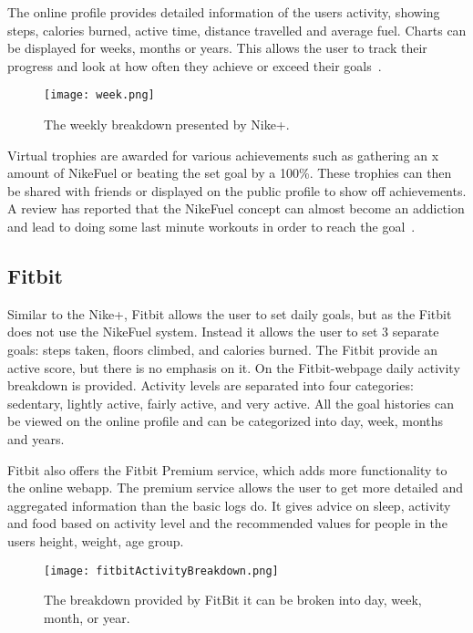 The online profile provides detailed information of the users activity, showing steps, calories burned, active time, distance travelled and average fuel. Charts can be displayed for weeks, months or years. This allows the user to track their progress and look at how often they achieve or exceed their goals~\cite{fuelbandTechSpce}. 

\begin{figure}[h!]
	\centering
		\texttt{[image: week.png]}
		\caption{\footnotesize The weekly breakdown presented by Nike+. \cite{fuelbandTechSpce}}
		\label{fig:activityBreakdown}
\end{figure}

Virtual trophies are awarded for various achievements such as gathering an x amount of NikeFuel or beating the set goal by a 100\%. These trophies can then be shared with friends or displayed on the public profile to show off achievements. A review has reported that the NikeFuel concept can almost become an addiction and lead to doing some last minute workouts in order to reach the goal~\cite{fuelbandDcRain}.

\subsection{Fitbit}
Similar to the Nike+, Fitbit \cite{fitBit} allows the user to set daily goals, but as the Fitbit does not use the NikeFuel system. Instead it allows the user to set 3 separate goals: steps taken, floors climbed, and calories burned. The Fitbit provide an active score, but there is no emphasis on it. On the Fitbit-webpage daily activity breakdown is provided. Activity levels are separated into four categories: sedentary, lightly active, fairly active, and very active. All the goal histories can be viewed on the online profile and can be categorized into day, week, months and years. 

Fitbit also offers the Fitbit Premium service, which adds more functionality to the online webapp. The premium service allows the user to get more detailed and aggregated information than the basic logs do. It gives advice on sleep, activity and food based on activity level and the recommended values for people in the users height, weight, age group.

\begin{figure}[h!]
	\centering
		\texttt{[image: fitbitActivityBreakdown.png]}
		\caption{\footnotesize The breakdown provided by FitBit it can be broken into day, week, month, or year.}
		\label{fig:fitbitActivityBreakdown}
\end{figure}

